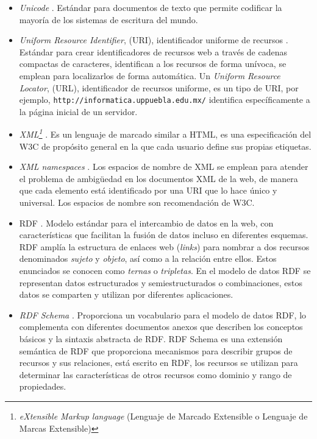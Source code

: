 \begin{itemize}
    \item \textit{Unicode} \cite{W3C}. Est\'andar para documentos de texto que permite codificar la mayor\'ia de los sistemas de escritura del mundo.
    
    \item \textit{Uniform Resource Identifier}, (URI), identificador uniforme de recursos \cite{W3C}. Es\-t\'an\-dar para crear identificadores de recursos web a trav\'es de cadenas compactas de ca\-rac\-te\-res, identifican a los recursos de forma un\'ivoca, se emplean para localizarlos de forma autom\'atica. Un \textit{Uniform Resource Locator}, (URL), identificador de recursos uniforme, es un tipo de URI, por ejemplo, \texttt{http://informatica.uppuebla.edu.mx/} identifica espec\'ificamente a la p\'agina inicial de un servidor. 

    \item \textit{XML\footnote{\textit{eXtensible Markup language} (Lenguaje de Marcado Extensible o Lenguaje de Marcas Extensible)}} \cite{W3C}. Es un lenguaje de marcado similar a HTML, es una especificaci\'on del W3C de prop\'osito general en la que cada usuario define sus propias etiquetas. 
    
    \item \textit{XML namespaces} \cite{W3C}. Los espacios de nombre de XML se emplean para atender el problema de ambig\"{u}edad en los documentos XML de la web, de manera que cada elemento est\'a identificado por una URI que lo hace \'unico y universal. Los espacios de nombre son recomendaci\'on de W3C.
    
    \item RDF \cite{W3CSemanticWeb}. Modelo est\'andar para el intercambio de datos en la web, con caracter\'isticas que facilitan la fusi\'on de datos incluso en diferentes esquemas. RDF ampl\'ia la estructura de enlaces web (\emph{links}) para nombrar a dos recursos denominados \emph{sujeto} y \emph{objeto}, as\'i como a la relaci\'on entre ellos. Estos enunciados se conocen como \textit{ternas} o \emph{tripletas}. En el modelo de datos RDF se representan datos estructurados y semiestructurados o combinaciones, estos datos se comparten y utilizan por diferentes aplicaciones.
    
    \item \textit{RDF Schema} \cite{W3CRDFSchema}. Proporciona un vocabulario para el modelo de datos RDF, lo complementa con diferentes documentos anexos que describen los conceptos b\'asicos y la sintaxis abstracta de RDF. RDF Schema es una extensi\'on sem\'antica de RDF que proporciona mecanismos para describir grupos de recursos y sus relaciones, est\'a escrito en RDF, los recursos se utilizan para determinar las caracter\'isticas de otros recursos como dominio y rango de propiedades.
    

\end{itemize}
